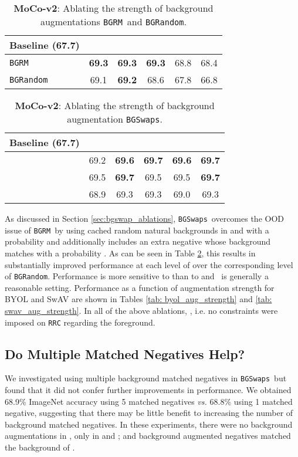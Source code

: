 \documentclass[twoside,11pt]{article}
\newcommand{\bgrm}{\texttt{BG\textunderscore RM}}
\newcommand{\bgswaps}{\texttt{BG\textunderscore Swaps}}
\newcommand{\bgrand}{\texttt{BG\textunderscore Random}}
\newcommand{\pneg}{}
\newcommand{\ppos}{}
\newcommand{\moco}{MoCo-v2}
\begin{document}
\begin{table}
    \centering
    \begin{tabular}{lccccc}\toprule
         Baseline (67.7) &  &  &  &   &  \\\midrule
         \bgrm &  \textbf{69.3} & \textbf{69.3} & \textbf{69.3} & 68.8 & 68.4 \\ 
         \bgrand &  69.1 & \textbf{69.2} & 68.6 & 67.8 & 66.8\\\bottomrule
    \end{tabular}
    \caption{\textbf{\moco}: Ablating the strength of background augmentations \bgrm~and \bgrand.}
    \label{tab:moco_bg_aug_strength_A}
\end{table}


\begin{table}
    \centering
    \begin{tabular}{lccccc}\toprule
         Baseline (67.7) &  &  &  &   &  \\\midrule
          &  69.2 & \textbf{69.6} &\textbf{ 69.7} & \textbf{69.6} & \textbf{69.7}  \\ 
         &  69.5 & \textbf{69.7} & 69.5 & 69.5 & \textbf{69.7} \\
         &  68.9 & 69.3 & 69.3 & 69.0 & 69.3 \\ \bottomrule
    \end{tabular}
    \caption{\textbf{\moco}: Ablating the strength of background augmentation \bgswaps.}
    \label{tab: moco_bg_aug_strength_B}
\end{table}


As discussed in Section \ref{sec:bgswap_ablations}, \bgswaps~overcomes the OOD issue of \bgrm~by using cached random natural backgrounds in  and  with a probability  and additionally includes an extra negative whose background matches  with a probability . As can be seen in Table \ref{tab: moco_bg_aug_strength_B}, this results in substantially improved performance at each level of  over the corresponding level of \bgrand. Performance is more sensitive to  than to  and \ppos\pneg~is generally a reasonable setting. Performance as a function of augmentation strength for BYOL and SwAV are shown in Tables \ref{tab: byol_aug_strength} and \ref{tab: swav_aug_strength}. In all of the above ablations, , i.e. no constraints were imposed on \texttt{RRC} regarding the foreground.

\subsection{Do Multiple Matched Negatives Help?}
\label{sec: multi_neg}
We investigated using multiple background matched negatives in \bgswaps~but found that it did not confer further improvements in performance. We obtained 68.9\% ImageNet accuracy using 5 matched negatives \textit{vs.} 68.8\% using 1 matched negative, suggesting that there may be little benefit to increasing the number of background matched negatives. In these experiments, there were no background augmentations in , only in  and ;  and background augmented negatives matched the background of . 
\end{document}
